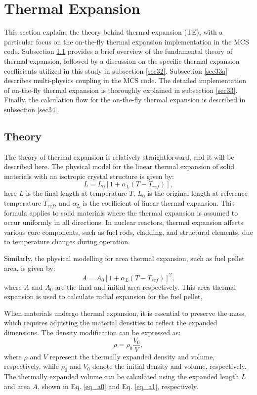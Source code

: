 \newpage 
\section{Thermal Expansion} \label{s3}
This section explains the theory behind thermal expansion (TE), with a particular focus on the on-the-fly thermal expansion implementation in the MCS code. Subsection \ref{sec31} provides a brief overview of the fundamental theory of thermal expansion, followed by a discussion on the specific thermal expansion coefficients utilized in this study in subsection \ref{sec32}. Subsection \ref{sec33a} describes multi-physics coupling in the MCS code. The detailed implementation of on-the-fly thermal expansion is thoroughly explained in subsection \ref{sec33}. Finally, the calculation flow for the on-the-fly thermal expansion is described in subsection \ref{sec34}.

\subsection{Theory} \label{sec31}

The theory of thermal expansion is relatively straightforward, and it will be described here. The physical model for the linear thermal expansion of solid materials with an isotropic crystal structure is given by:
\begin{equation}
    L=L_0\left[1+\alpha_L\left(T-T_{ref}\right)\right],
    \label{eq_a0}
\end{equation}
here $L$ is the final length at temperature $T$, $L_0$ is the original length at reference temperature $T_{ref}$, and $\alpha_L$ is the coefficient of linear thermal expansion.
This formula applies to solid materials where the thermal expansion is assumed to occur uniformly in all directions. In nuclear reactors, thermal expansion affects various core components, such as fuel rods, cladding, and structural elements, due to temperature changes during operation.

Similarly, the physical modelling for area thermal expansion, such as fuel pellet area, is given by: 
\begin{equation}
    A=A_0\left[1+\alpha_L\left(T-T_{ref}\right)\right]^2,
    \label{eq_a1}
\end{equation}
where $A$ and $A_0$ are the final and initial area respectively. This area thermal expansion is used to calculate radial expansion for the fuel pellet,

When materials undergo thermal expansion, it is essential to preserve the mass, which requires adjusting the material densities to reflect the expanded dimensions. The density modification can be expressed as:
\begin{equation}
    \rho=\rho_0\frac{V_0}{V},
\end{equation}
where $\rho$ and $V$ represent the thermally expanded density and volume, respectively, while $\rho_0$ and $V_0$ denote the initial density and volume, respectively. The thermally expanded volume can be calculated using the expanded length $L$ and area $A$, shown in Eq. \ref{eq_a0} and Eq. \ref{eq_a1}, respectively.

